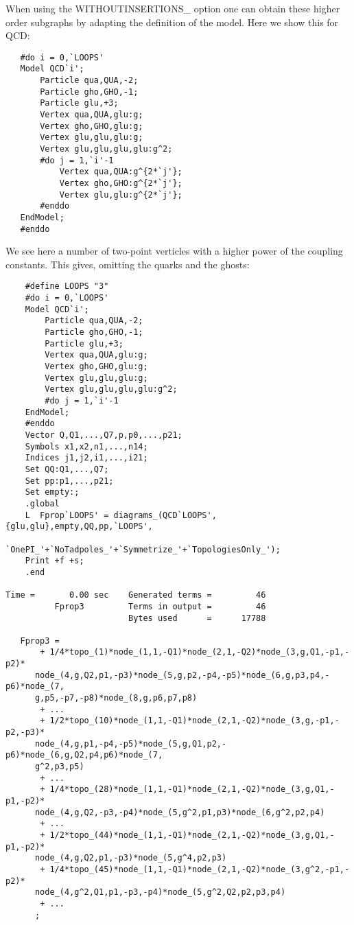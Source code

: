 When using the WITHOUTINSERTIONS\_ option one can obtain these higher order 
subgraphs by adapting the definition of the model. Here we show this for 
QCD:
\begin{verbatim}
   #do i = 0,`LOOPS'
   Model QCD`i';
       Particle qua,QUA,-2;
       Particle gho,GHO,-1;
       Particle glu,+3;
       Vertex qua,QUA,glu:g;
       Vertex gho,GHO,glu:g;
       Vertex glu,glu,glu:g;
       Vertex glu,glu,glu,glu:g^2;
       #do j = 1,`i'-1
           Vertex qua,QUA:g^{2*`j'};
           Vertex gho,GHO:g^{2*`j'};
           Vertex glu,glu:g^{2*`j'};
       #enddo
   EndModel;
   #enddo
\end{verbatim}
We see here a number of two-point verticles with a higher power of the 
coupling constants. This gives, omitting the quarks and the ghosts:
\begin{verbatim}
    #define LOOPS "3"
    #do i = 0,`LOOPS'
    Model QCD`i';
        Particle qua,QUA,-2;
        Particle gho,GHO,-1;
        Particle glu,+3;
        Vertex qua,QUA,glu:g;
        Vertex gho,GHO,glu:g;
        Vertex glu,glu,glu:g;
        Vertex glu,glu,glu,glu:g^2;
        #do j = 1,`i'-1
    EndModel;
    #enddo
    Vector Q,Q1,...,Q7,p,p0,...,p21;
    Symbols x1,x2,n1,...,n14;
    Indices j1,j2,i1,...,i21;
    Set QQ:Q1,...,Q7;
    Set pp:p1,...,p21;
    Set empty:;
    .global
    L  Fprop`LOOPS' = diagrams_(QCD`LOOPS',{glu,glu},empty,QQ,pp,`LOOPS',
                   `OnePI_'+`NoTadpoles_'+`Symmetrize_'+`TopologiesOnly_');
    Print +f +s;
    .end

Time =       0.00 sec    Generated terms =         46
          Fprop3         Terms in output =         46
                         Bytes used      =      17788

   Fprop3 =
       + 1/4*topo_(1)*node_(1,1,-Q1)*node_(2,1,-Q2)*node_(3,g,Q1,-p1,-p2)*
      node_(4,g,Q2,p1,-p3)*node_(5,g,p2,-p4,-p5)*node_(6,g,p3,p4,-p6)*node_(7,
      g,p5,-p7,-p8)*node_(8,g,p6,p7,p8)
       + ...
       + 1/2*topo_(10)*node_(1,1,-Q1)*node_(2,1,-Q2)*node_(3,g,-p1,-p2,-p3)*
      node_(4,g,p1,-p4,-p5)*node_(5,g,Q1,p2,-p6)*node_(6,g,Q2,p4,p6)*node_(7,
      g^2,p3,p5)
       + ...
       + 1/4*topo_(28)*node_(1,1,-Q1)*node_(2,1,-Q2)*node_(3,g,Q1,-p1,-p2)*
      node_(4,g,Q2,-p3,-p4)*node_(5,g^2,p1,p3)*node_(6,g^2,p2,p4)
       + ...
       + 1/2*topo_(44)*node_(1,1,-Q1)*node_(2,1,-Q2)*node_(3,g,Q1,-p1,-p2)*
      node_(4,g,Q2,p1,-p3)*node_(5,g^4,p2,p3)
       + 1/4*topo_(45)*node_(1,1,-Q1)*node_(2,1,-Q2)*node_(3,g^2,-p1,-p2)*
      node_(4,g^2,Q1,p1,-p3,-p4)*node_(5,g^2,Q2,p2,p3,p4)
       + ...
      ;
\end{verbatim}
